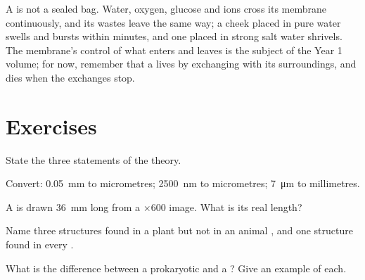 \begin{remark}\label{rem:g10:cells-common-unit:open}
A  is not a sealed bag. Water, oxygen, glucose and ions cross its
membrane continuously, and its wastes leave the same way; a cheek 
placed in pure water swells and bursts within minutes, and one placed
in strong salt water shrivels. The membrane's control of what enters
and leaves is the subject of the Year 1 volume; for now, remember that
a  lives by exchanging with its surroundings, and dies when the
exchanges stop.
\end{remark}

\section{Exercises}

\begin{exercise}[$\star$]\label{exo:g10:cells-common-unit:1}
State the three statements of the  theory.
\end{exercise}

\begin{exercise}[$\star$]\label{exo:g10:cells-common-unit:2}
Convert: \qty{0.05}{mm} to micrometres; \qty{2500}{nm} to micrometres;
\qty{7}{\micro m} to millimetres.
\end{exercise}

\begin{exercise}[$\star$]\label{exo:g10:cells-common-unit:3}
A  is drawn \qty{36}{mm} long from a $\times 600$ image. What is its
real length?
\end{exercise}

\begin{exercise}[$\star$]\label{exo:g10:cells-common-unit:4}
Name three structures found in a plant  but not in an animal ,
and one structure found in every .
\end{exercise}

\begin{exercise}[$\star$]\label{exo:g10:cells-common-unit:5}
What is the difference between a prokaryotic and a ?
Give an example of each.
\end{exercise}


